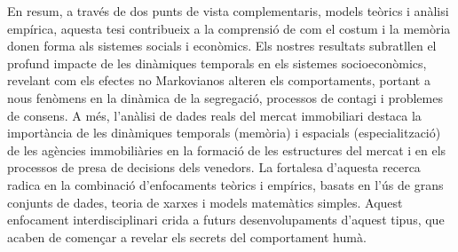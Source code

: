 \thispagestyle{empty}

En resum, a través de dos punts de vista complementaris, models teòrics i anàlisi empírica, aquesta tesi contribueix a la comprensió de com el costum i la memòria donen forma als sistemes socials i econòmics. Els nostres resultats subratllen el profund impacte de les dinàmiques temporals en els sistemes socioeconòmics, revelant com els efectes no Markovianos alteren els comportaments, portant a nous fenòmens en la dinàmica de la segregació, processos de contagi i problemes de consens. A més, l'anàlisi de dades reals del mercat immobiliari destaca la importància de les dinàmiques temporals (memòria) i espacials (especialització) de les agències immobiliàries en la formació de les estructures del mercat i en els processos de presa de decisions dels venedors. La fortalesa d'aquesta recerca radica en la combinació d'enfocaments teòrics i empírics, basats en l'ús de grans conjunts de dades, teoria de xarxes i models matemàtics simples. Aquest enfocament interdisciplinari crida a futurs desenvolupaments d'aquest tipus, que acaben de començar a revelar els secrets del comportament humà.

\vfill